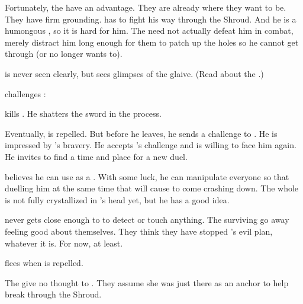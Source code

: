 \begin{changes}
    Fortunately, the \resphain have an advantage. 
    They are already where they want to be. 
    They have firm grounding.
    \Ishnaruchaefir has to fight his way through the Shroud. 
    And he is a humongous \vertex, so it is hard for him. 
    The \resphain need not actually defeat him in combat, merely distract him long enough for them to patch up the holes so he cannot get through (or no longer wants to). 
    
    \Ishnaruchaefir is never seen clearly, but \Teshrial sees glimpses of the glaive. 
    (Read about the .)
    
    \Teshrial challenges \Ishnaruchaefir:
    
    \Ishnaruchaefir kills \Teshrial.
    He shatters the sword \Turishah in the process. 
    
    \begin{comment}
      \subparagraph{\Ishnaruchaefir leaves}
    \end{comment}
    
    Eventually, \Ishnaruchaefir is repelled. 
    But before he leaves, he sends a challenge to \Teshrial.
    He is impressed by \Teshrial's bravery.
    He accepts \Teshrial's challenge and is willing to face him again.
    He invites \Teshrial to find a time and place for a new duel.
    
    
    \Ishnaruchaefir believes he can use \Teshrial as a .
    With some luck, he can manipulate everyone so that \Teshrial duelling him at the same time that \Secherdamon will cause \Malcur to come crashing down.
    The whole  is not fully crystallized in \Ishnaruchaefir's head yet, but he has a good idea.
    
    \Ishnaruchaefir never gets close enough to \Azmith to detect or touch anything. 
    The surviving \resphain go away feeling good about themselves.
    They think they have stopped \Ishnaruchaefir's evil plan, whatever it is.
    For now, at least. 
    
    \Criseis flees when \Ishnaruchaefir is repelled. 
    
    The \resphain give no thought to \Criseis. 
    They assume she was just there as an anchor to help \Ishnaruchaefir break through the Shroud. 
\end{changes}









